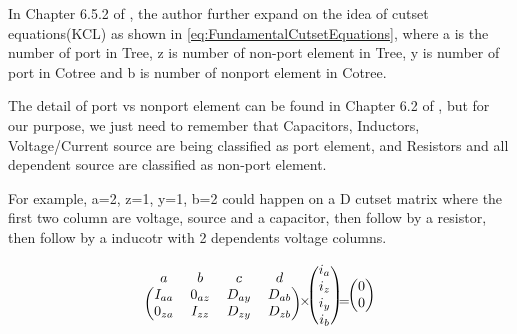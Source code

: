 \documentclass[conference]{IEEEtran}
\begin{document}
In Chapter 6.5.2 of \cite{LOChua}, the author further expand on the idea of 
cutset equations(KCL) as shown in \ref{eq:FundamentalCutsetEquations}, 
where a is the number of port in Tree, z is number of non-port element in Tree,
y is number of port in Cotree and b is number of nonport element in Cotree.

The detail of port vs nonport element can be found in Chapter 6.2 of \cite{LOChua}, but for our purpose,
we just need to remember that Capacitors, Inductors, Voltage/Current source are being classified as port element,
and Resistors and all dependent source are classified as non-port element.

For example, a=2, z=1, y=1, b=2 could happen on a D cutset matrix where the
first two column are voltage, source and a capacitor, then follow by a resistor, then follow by a inducotr with 2 dependents voltage columns.


\begin{equation}
  \begin{array}{c@{}c@{}c@{}c@{}c}  %
  \begin{blockarray}{cccc}
  a & b & c & d \\
  \begin{block}{(cccc)}
    I_{aa} & 0_{az} & D_{ay} & D_{ab} \\
    0_{za} & I_{zz} & D_{zy} & D_{zb} \\
  \end{block}
  \end{blockarray}
  &
  \times
  &
  \begin{blockarray}{c}
  \begin{block}{(c)}
    i_a \\
    i_z \\
    i_y \\
    i_b \\
  \end{block}
  \end{blockarray}
  & 
  =
  &
  \begin{blockarray}{c}
  \begin{block}{(c)}
    0\\
    0\\
  \end{block}
  \end{blockarray}
  \end{array}
  \label{eq:FundamentalCutsetEquations}
\end{equation}
\end{document}
